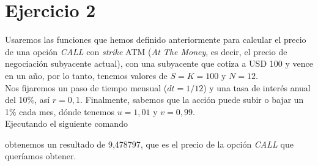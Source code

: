 \documentclass[a4paper,]{article}
\begin{document}
\section*{Ejercicio 2}
Usaremos las funciones que hemos definido anteriormente para calcular el precio de una opción \textit{CALL} con \textit{strike} ATM (\textit{At The Money}, es decir, el precio de negociación subyacente actual), con una subyacente que cotiza a USD 100 y vence en un año, por lo tanto, tenemos valores de $S=K=100$ y $N=12$. \\

Nos fijaremos un paso de tiempo mensual ($dt=1/12$) y una tasa de interés anual del 10\%, así $r=0,1$. Finalmente, sabemos que la acción puede subir o bajar un 1\% cada mes, dónde tenemos $u=1,01$ y $v=0,99$. \\

Ejecutando el siguiente comando
\vspace{1cm}

obtenemos un resultado de 9,478797, que es el precio de la opción \textit{CALL} que queríamos obtener.
\end{document}
